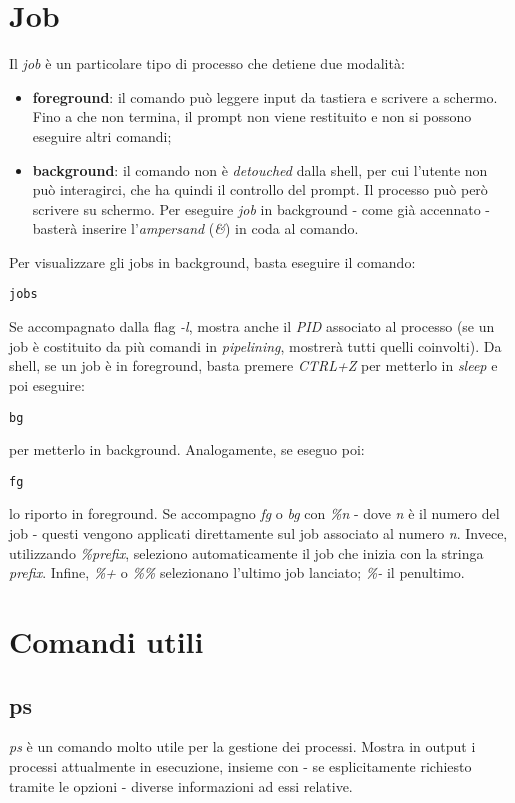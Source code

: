 \section{Job}
Il \textit{job} è un particolare tipo di processo che detiene due modalità:
\begin{itemize}
    \item \textbf{foreground}: il comando può leggere input da tastiera e scrivere a schermo. Fino a che non termina, il prompt non viene restituito e non si possono eseguire altri comandi;
    \item \textbf{background}: il comando non è \textit{detouched} dalla shell, per cui l'utente non può interagirci, che ha quindi il controllo del prompt. Il processo può però scrivere su schermo. Per eseguire \textit{job} in background - come già accennato - basterà inserire l'\textit{ampersand} (\textit{\&}) in coda al comando.
\end{itemize}
Per visualizzare gli jobs in background, basta eseguire il comando:
\begin{lstlisting}
jobs
\end{lstlisting}
Se accompagnato dalla flag \textit{-l}, mostra anche il \textit{PID} associato al processo (se un job è costituito da più comandi in \textit{pipelining}, mostrerà tutti quelli coinvolti).
Da shell, se un job è in foreground, basta premere \textit{CTRL+Z} per metterlo in \textit{sleep} e poi eseguire:
\begin{lstlisting}
bg
\end{lstlisting}
per metterlo in background.
Analogamente, se eseguo poi:
\begin{lstlisting}
fg
\end{lstlisting}
lo riporto in foreground.
Se accompagno \textit{fg} o \textit{bg} con \textit{\%n} - dove \textit{n} è il numero del job - questi vengono applicati direttamente sul job associato al numero \textit{n}.
Invece, utilizzando \textit{\%prefix}, seleziono automaticamente il job che inizia con la stringa \textit{prefix}.
Infine, \textit{\%+} o \textit{\%\%} selezionano l'ultimo job lanciato; \textit{\%-} il penultimo.

\section{Comandi utili}

\subsection{ps}
\textit{ps} è un comando molto utile per la gestione dei processi.
Mostra in output i processi attualmente in esecuzione, insieme con - se esplicitamente richiesto tramite le opzioni - diverse informazioni ad essi relative.


